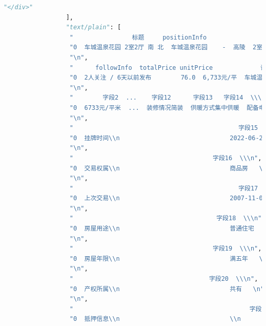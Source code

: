 \documentclass[withoutpreface,bwprint]{cumcmthesis} %
\begin{document}
\begin{appendices}
\begin{lstlisting}[language=Python]
                  "</div>"
                 ],
                 "text/plain": [
                  "                标题     positionInfo                                houseInfo  \\\n",
                  "0  车城温泉花园 2室2厅 南 北  车城温泉花园    -  高陵  2室2厅 | 112.89平米 | 南 北 | 简装 | 6层  | 板塔结合   \n",
                  "\n",
                  "      followInfo  totalPrice unitPrice             详情标题        日期时间   字段1  \\\n",
                  "0  2人关注 / 6天以前发布        76.0  6,733元/平  车城温泉花园 2室2厅 南 北  2022-06-25  76.0   \n",
                  "\n",
                  "        字段2  ...    字段12      字段13   字段14  \\\n",
                  "0  6733元/平米  ...  装修情况简装  供暖方式集中供暖  配备电梯无   \n",
                  "\n",
                  "                                             字段15  \\\n",
                  "0  挂牌时间\\n                              2022-06-25   \n",
                  "\n",
                  "                                      字段16  \\\n",
                  "0  交易权属\\n                              商品房   \n",
                  "\n",
                  "                                             字段17  \\\n",
                  "0  上次交易\\n                              2007-11-07   \n",
                  "\n",
                  "                                       字段18  \\\n",
                  "0  房屋用途\\n                              普通住宅   \n",
                  "\n",
                  "                                      字段19  \\\n",
                  "0  房屋年限\\n                              满五年   \n",
                  "\n",
                  "                                     字段20  \\\n",
                  "0  产权所属\\n                              共有   \n",
                  "\n",
                  "                                                字段21  \n",
                  "0  抵押信息\\n                              \\n        ...  \n",

\end{lstlisting}
\end{appendices}
\end{document}
